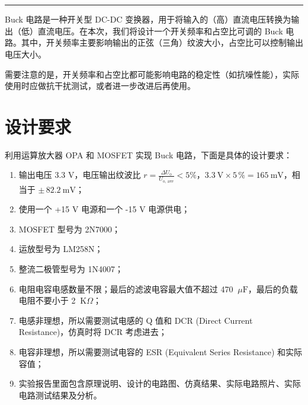 \documentclass[UTF8]{article}
\def\kO{\ \mathrm{K}\Omega}
\def\uF{\ \mu\mathrm{F}}
\def\kO{\ \mathrm{K}\Omega}
\def\uF{\ \mu\mathrm{F}}
\theoremstyle{MyLineTheoremStyle} %
\theoremstyle{MyBlockTheoremStyle} %
\theoremstyle{MySubsubsectionStyle} %
\begin{document}
\begin{center}\large
    \vspace*{-0.8cm}
    \\\vspace{0.2cm}
    \\
\end{center}
\vspace{-0.5cm}
\noindent\rule{\textwidth}{0.075em}   %
\vspace{-1.0cm}

\setcounter{tocdepth}{2}  %
\noindent\tableofcontents\thispagestyle{fancy}   %
\newpage



Buck 电路是一种开关型 DC-DC 变换器，用于将输入的（高）直流电压转换为输出（低）直流电压。在本次，我们将设计一个开关频率和占空比可调的 Buck 电路。其中，开关频率主要影响输出的正弦（三角）纹波大小，占空比可以控制输出电压大小。

需要注意的是，开关频率和占空比都可能影响电路的稳定性（如抗噪性能），实际使用时应做抗干扰测试，或者进一步改进后再使用。


\section{设计要求}
利用运算放大器 OPA 和 MOSFET 实现 Buck 电路，下面是具体的设计要求：
\begin{enumerate}
\item 输出电压 3.3 V，电压输出纹波比 $r = \frac{\Delta U_{\text{o}}}{U_{\text{o, ave}}} < 5\%$，$3.3\ \mathrm{V}\times 5\,\% = 165\ \mathrm{mV}$，相当于 $\pm\, 82.2\ \mathrm{mV}$；
\item 使用一个 +15 V 电源和一个 -15 V 电源供电；
\item MOSFET 型号为 2N7000；
\item 运放型号为 LM258N；
\item 整流二极管型号为 1N4007；
\item 电阻电容电感数量不限；最后的滤波电容最大值不超过 470 $\uF$，最后的负载电阻不要小于 2 $\kO$；
\item 电感非理想，所以需要测试电感的 Q 值和 DCR (Direct Current Resistance)，仿真时将 DCR 考虑进去；
\item 电容非理想，所以需要测试电容的 ESR (Equivalent Series Resistance) 和实际容值；
\item 实验报告里面包含原理说明、设计的电路图、仿真结果、实际电路照片、实际电路测试结果及分析。
\end{enumerate}
\end{document}
